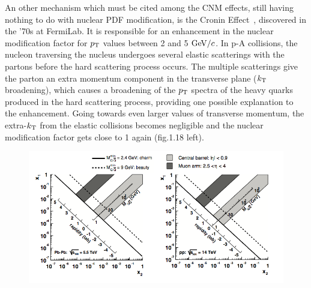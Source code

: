 An other mechanism which must be cited among the CNM effects, still having nothing to do with nuclear PDF modification, is the Cronin Effect~\cite{Cronin:1974zm}, discovered in the ’70s at FermiLab. It is responsible for an enhancement in the nuclear modification factor for $p_{\rm T}$ values between 2 and 5 $\mathrm{GeV}/c$. In p-A collisions, the nucleon traversing the nucleus undergoes several elastic scatterings with the partons before the hard scattering process occurs. The multiple scatterings give the parton an extra momentum component in the transverse plane ($k_{\rm T}$ broadening), which causes a broadening of the $p_{\rm T}$ spectra of the heavy quarks produced in the hard scattering process, providing one possible explanation to the enhancement. Going towards even larger values of transverse momentum, the extra-$k_{\rm T}$ from the elastic collisions becomes negligible and the nuclear modification factor gets close to 1 again (fig.1.18 left).\\
\begin{figure}[!ht]
  \centering
  \includegraphics[width=15cm]{FigCap2/xBjork.png}
  \caption{}
  \label{fig:xBjork}
\end{figure}



